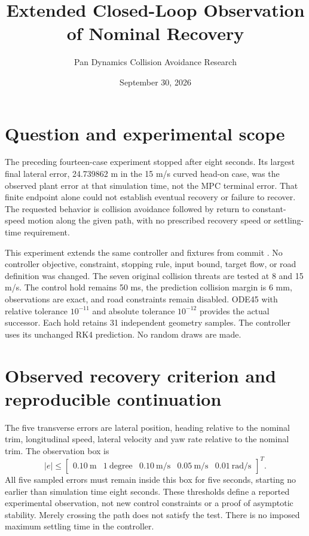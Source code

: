 \documentclass[11pt]{article}
\title{Extended Closed-Loop Observation of Nominal Recovery}
\author{Pan Dynamics Collision Avoidance Research}
\date{September 30, 2026}
\begin{document}
\maketitle

\section{Question and experimental scope}
The preceding fourteen-case experiment stopped after eight seconds. Its largest
final lateral error, 24.739862 m in the 15 m/s curved head-on case, was the
observed plant error at that simulation time, not the MPC terminal error.
That finite endpoint alone could not establish eventual recovery or failure
to recover. The requested behavior is collision avoidance followed by return
to constant-speed motion along the given path, with no prescribed recovery
speed or settling-time requirement.

This experiment extends the same controller and fixtures from commit
.
No controller objective, constraint, stopping rule, input bound, target flow,
or road definition was changed. The seven original collision threats are
tested at 8 and 15 m/s. The control hold remains 50 ms, the prediction collision
margin is 6 mm, observations are exact, and road constraints remain disabled.
ODE45 with relative tolerance $10^{-11}$ and absolute tolerance $10^{-12}$
provides the actual successor. Each hold retains 31 independent geometry
samples. The controller uses its unchanged RK4 prediction. No random draws
are made.

\section{Observed recovery criterion and reproducible continuation}
The five transverse errors are lateral position, heading relative to the
nominal trim, longitudinal speed, lateral velocity and yaw rate relative to
the nominal trim. The observation box is
\[
|e|\le
\begin{bmatrix}
0.10\ \mathrm{m}&1\ \mathrm{degree}&0.10\ \mathrm{m/s}&
0.05\ \mathrm{m/s}&0.01\ \mathrm{rad/s}
\end{bmatrix}^{\!T}.
\]
All five sampled errors must remain inside this box for five seconds, starting
no earlier than simulation time eight seconds. These thresholds define a
reported experimental observation, not new control constraints or a proof
of asymptotic stability. Merely crossing the path does not satisfy the test.
There is no imposed maximum settling time in the controller.
\end{document}
